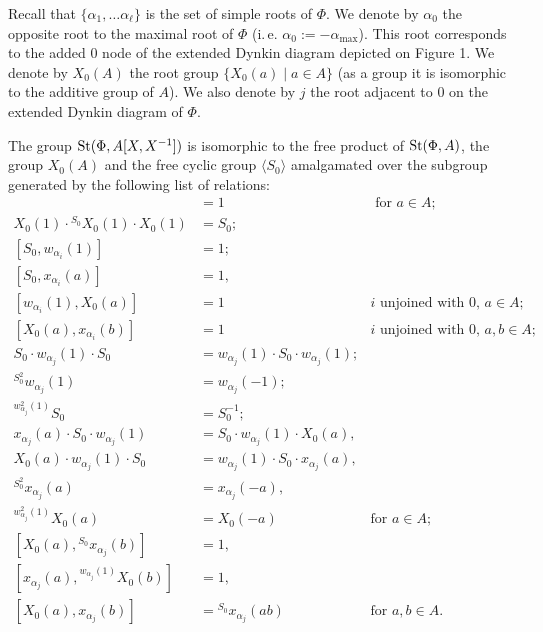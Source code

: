 Recall that $\{ \alpha_1, \ldots \alpha_\ell \}$ is the set of simple roots of $\Phi$.
We denote by $\alpha_0$ the opposite root to the maximal root of $\Phi$ (i.\,e. $\alpha_0 := -\alpha_\mathrm{max}$).
This root corresponds to the added $0$ node of the extended Dynkin diagram depicted on Figure 1.
We denote by $X_0(A)$ the root group $\{ X_0(a) \mid a \in A\}$ (as a group it is isomorphic to the additive group of $A$).
We also denote by $j$ the root adjacent to $0$ on the extended Dynkin diagram of $\Phi$.
\begin{prop} \label{prop:Allcock-affine} The group $\operatorname{St}(\Phi, A[X, X^{-1}])$ is isomorphic to the free product of $\operatorname{St}(\Phi, A)$, the group $X_0(A)$ and the free cyclic group $\langle S_0 \rangle$
     amalgamated over the subgroup generated by the following list of relations:
    {\allowdisplaybreaks\begin{align}
        [S_0^2, X_0(a)] & = 1 & \text{ for $a \in A$; } \label{eq:Allcock-2} \\
        X_0(1) \cdot {}^{S_0} X_0(1) \cdot X_0(1) & = S_0; \label{eq:Allcock-3} \\
        [S_0, w_{\alpha_i}(1)] & = 1; &  \label{eq:Allcock-4} \\
        [S_0, x_{\alpha_i}(a)] & = 1, &  \label{eq:Allcock-5-1}\\
        [w_{\alpha_i}(1), X_0(a)] & = 1 & \text{$i$ unjoined with $0$, $a \in A;$} \label{eq:Allcock-5-2} \\
        [X_0(a), x_{\alpha_i}(b)] & = 1 & \text{$i$ unjoined with $0$, $a, b \in A;$} \label{eq:Allcock-6} \\
        S_0 \cdot w_{\alpha_j}(1) \cdot S_0 & = w_{\alpha_j}(1) \cdot S_0 \cdot w_{\alpha_j}(1); \label{eq:Allcock-7} \\
        {}^{S_0^2} w_{\alpha_j}(1) & = w_{\alpha_j}(-1); \label{eq:Allcock-8-1} \\
        {}^{w_{\alpha_j}^2(1)} S_0 & = S_0^{-1}; \label{eq:Allcock-8-2} \\
        x_{\alpha_j}(a) \cdot S_0 \cdot w_{\alpha_j}(1) & = S_0 \cdot w_{\alpha_j}(1) \cdot X_0(a), & \label{eq:Allcock-9-1} \\
        X_0(a) \cdot w_{\alpha_j}(1) \cdot S_0 & = w_{\alpha_j}(1) \cdot S_0 \cdot x_{\alpha_j}(a), & \label{eq:Allcock-9-2} \\
        {}^{S_0^2} x_{\alpha_j}(a) & = x_{\alpha_j}(-a), & \label{eq:Allcock-10-1} \\
        {}^{w_{\alpha_j}^2(1)} X_0(a) & = X_0(-a) & \text{for $a \in A;$} \label{eq:Allcock-10-2} \\
        [X_0(a), {}^{S_0} x_{\alpha_j}(b)] &= 1, & \label{eq:Allcock-11-1} \\
        [x_{\alpha_j}(a), {}^{w_{\alpha_j}(1)}X_0(b)] &= 1, & \label{eq:Allcock-11-2} \\
        [X_0(a), x_{\alpha_j}(b)] &= {}^{S_0} x_{\alpha_j}(ab) & \text{for $a, b \in A.$} \label{eq:Allcock-12}
    \end{align}}
\end{prop}
